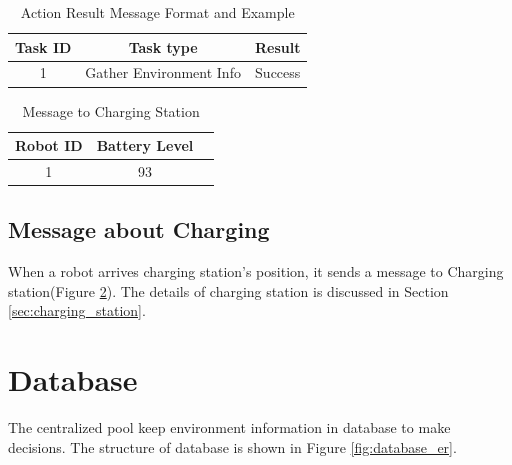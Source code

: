 \begin{table}[htb]
\centering
\begin{tabular}{|c|c|c|} 
\hline
Task ID 	& Task type	& Result\\
\hline\hline
1 & Gather Environment Info & Success \\ [1ex] 
\hline
\end{tabular}
\caption{Action Result Message Format and Example}
\label{tab:result_message}
\end{table}


\begin{table}[htb]
\centering
\begin{tabular}{|c|c|c|} 
\hline
Robot ID & Battery Level \\
\hline\hline
1 & 93 \\ [1ex] 
\hline
\end{tabular}
\caption{Message to Charging Station}
\label{tab:message_to_charging_staion}
\end{table}

\subsection{Message about Charging}
  
When a robot arrives charging station's position, it sends a message to Charging station(Figure \ref{tab:message_to_charging_staion}). The details of charging station is discussed in Section \ref{sec:charging_station}. 

\section{Database}
The centralized pool keep environment information in database to make decisions. The structure of database is shown in Figure \ref{fig:database_er}.

